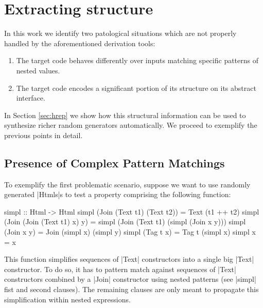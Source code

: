 \section{Extracting structure}


In this work we identify two patological situations which are not properly
handled by the aforementioned derivation tools:

\begin{enumerate}
\item The target code behaves differently over inputs matching specific patterns
  of nested values.
\item The target code encodes a significant portion of its structure on its
  abstract interface.
\end{enumerate}

In Section \ref{sec:hrep} we show how this structural information can be used to
synthesize richer random generators automatically.
%
We proceed to exemplify the previous points in detail.

\subsection*{\textbf{Presence of Complex Pattern Matchings}}

To exemplify the first problematic scenario, suppose we want to use randomly
generated |Htmls|s to test a property comprising the following function:
%
\begin{code}
simpl :: Html -> Html
simpl (Join (Text t1) (Text t2))
  = Text (t1 ++ t2)
simpl (Join (Join (Text t1) x) y)
  = simpl (Join (Text t1) (simpl (Join x y)))
simpl (Join x y) = Join (simpl x) (simpl y)
simpl (Tag t x) = Tag t (simpl x)
simpl x = x
\end{code}

This function simplifies sequences of |Text| constructors into a single big
|Text| constructor.
%
To do so, it has to pattern match against sequences of |Text| constructors
combined by a |Join| constructor using nested patterns (see |simpl| fist and
second clauses).
%
The remaining clauses are only meant to propagate this simplification within
nested expressions.


